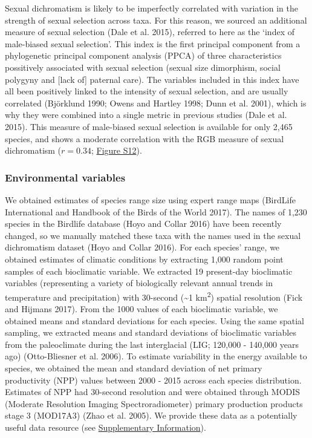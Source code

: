 \documentclass[]{article}
\begin{document}
Sexual dichromatism is likely to be imperfectly correlated with
variation in the strength of sexual selection across taxa. For this
reason, we sourced an additional measure of sexual selection (Dale et
al. 2015), referred to here as the `index of male-biased sexual
selection'. This index is the first principal component from a
phylogenetic principal component analysis (PPCA) of three
characteristics possitively associated with sexual selection (sexual
size dimorphism, social polygyny and {[}lack of{]} paternal care). The
variables included in this index have all been positively linked to the
intensity of sexual selection, and are usually correlated (Björklund
1990; Owens and Hartley 1998; Dunn et al. 2001), which is why they were
combined into a single metric in previous studies (Dale et al. 2015).
This measure of male-biased sexual selection is available for only 2,465
species, and shows a moderate correlation with the RGB measure of sexual
dichromatism (\(r = 0.34\);
\href{https://justincally.github.io/SexualSelection_Speciation/#analysis_using_male-biased_measure_of_sexual_selection}{Figure S12}).

\hypertarget{environmental-variables}{%
\subsubsection{Environmental variables}\label{environmental-variables}}

We obtained estimates of species range size using expert range maps
(BirdLife International and Handbook of the Birds of the World 2017).
The names of 1,230 species in the Birdlife database (Hoyo and Collar
2016) have been recently changed, so we manually matched these taxa with
the names used in the sexual dichromatism dataset (Hoyo and Collar
2016). For each species' range, we obtained estimates of climatic
conditions by extracting 1,000 random point samples of each bioclimatic
variable. We extracted 19 present-day bioclimatic variables
(representing a variety of biologically relevant annual trends in
temperature and precipitation) with 30-second (\textasciitilde{}1
km\textsuperscript{2}) spatial resolution (Fick and Hijmans 2017). From
the 1000 values of each bioclimatic variable, we obtained means and
standard deviations for each species. Using the same spatial sampling,
we extracted means and standard deviations of bioclimatic variables from
the paleoclimate during the last interglacial (LIG; 120,000 - 140,000
years ago) (Otto-Bliesner et al. 2006). To estimate variability in the
energy available to species, we obtained the mean and standard deviation
of net primary productivity (NPP) values between 2000 - 2015 across each
species distribution. Estimates of NPP had 30-second resolution and were
obtained through MODIS (Moderate Resolution Imaging Spectroradiometer)
primary production products stage 3 (MOD17A3) (Zhao et al. 2005). We
provide these data as a potentially useful data resource (see
\href{https://justincally.github.io/SexualSelection_Speciation/}{Supplementary Information}).
\end{document}
